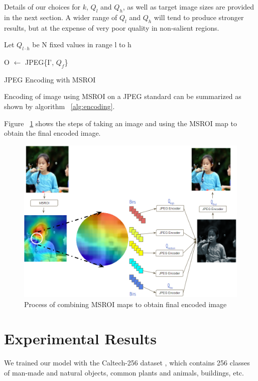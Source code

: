 Details of our choices for $k$, $Q_l$ and $Q_h$, as well as target image sizes are provided in the next section.  A wider range of $Q_l$ and $Q_h$ will tend to produce stronger results, but at the expense of very poor quality in non-salient regions.

\begin{algorithm}[H]

    Let $Q_{l \cdot h}$ be N fixed values in range l to h
    
    O $\gets$ JPEG\{I', $Q_f$\}
\caption[Encoding with MSROI]{JPEG Encoding with MSROI}
\label{alg:encoding}
\end{algorithm}

Encoding of image using MSROI on a JPEG standard can be summarized as shown by algorithm ~\ref{alg:encoding}.

Figure ~\ref{fig_encoding_steps} shows the steps of taking an image and using the MSROI map to obtain the final encoded image.

\begin{figure}[H]
    \centering
    \includegraphics[scale=0.45]{figures/semantic/variable_q_jpeg.png}
    \caption[Encoding with MSROI]{Process of combining MSROI maps to obtain final encoded image \label{fig_encoding_steps}}
\end{figure}


\section{Experimental Results}
We trained our model with the Caltech-256 dataset \cite{griffin2007caltech}, which contains 256 classes of man-made and natural objects, common plants and animals, buildings, etc.

